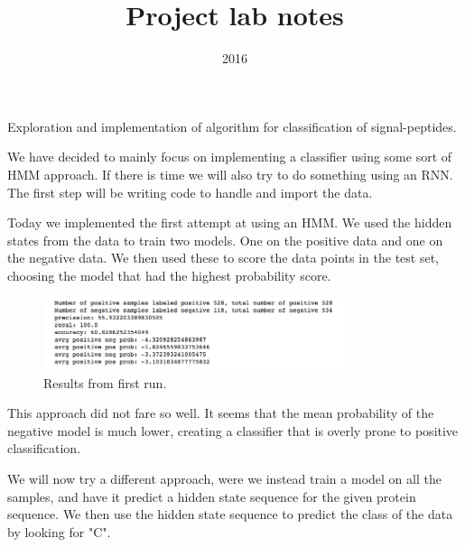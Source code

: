 \documentclass[a4paper]{tufte-handout}
\title{Project lab notes}
\date{2016}
\begin{document}
\maketitle


\begin{projects}
	\begin{description}
		\item Exploration and implementation of algorithm for classification of 
            signal-peptides.
    \end{description}
\end{projects}


We have decided to mainly focus on implementing a classifier using some sort of HMM approach. 
If there is time we will also try to do something using an RNN. The first step will be writing code to handle and import the data.



Today we implemented the first attempt at using an HMM. We used the hidden states from the data to train two models. One on the positive data and one on the negative data. We then used these to score the data points in the test set, choosing the model that had the highest probability score. 

\begin{figure}
    \begin{center}
      \includegraphics[width=0.8\textwidth]{pics/HMM_old.png}
    \end{center}
    \caption{Results from first run.}
\end{figure}

This approach did not fare so well. It seems that the mean probability of the negative model is much lower, creating a classifier that is overly prone to positive classification.

We will now try a different approach, were we instead train a model on all the samples, and have it predict a hidden state sequence for the given protein sequence. We then use the hidden state sequence to predict the class of the data by looking for "C".
\end{document}
